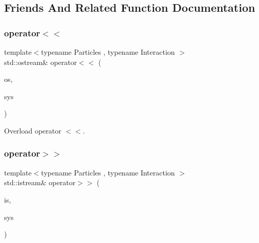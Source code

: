\subsection{Friends And Related Function Documentation}
\mbox{\label{class_space_h_1_1_particle_system_adfa6e43fea537f62484260b659155912}} 
\subsubsection{\texorpdfstring{operator$<$$<$}{operator<<}}
{\footnotesize\ttfamily template$<$typename Particles , typename Interaction $>$ \\
std\+::ostream\& operator$<$$<$ (\begin{DoxyParamCaption}\item[{std\+::ostream \&}]{os,  }\item[{const \mbox{\hyperlink{class_space_h_1_1_particle_system}{Particle\+System}}$<$ \mbox{\hyperlink{struct_space_h_1_1_particles}{Particles}}, Interaction $>$ \&}]{sys }\end{DoxyParamCaption})\hspace{0.3cm}{\ttfamily [friend]}}



Overload operator $<$$<$. 

\mbox{\label{class_space_h_1_1_particle_system_a5e0b0ba1120f72d983344016f57daa92}} 
\subsubsection{\texorpdfstring{operator$>$$>$}{operator>>}}
{\footnotesize\ttfamily template$<$typename Particles , typename Interaction $>$ \\
std\+::istream\& operator$>$$>$ (\begin{DoxyParamCaption}\item[{std\+::istream \&}]{is,  }\item[{\mbox{\hyperlink{class_space_h_1_1_particle_system}{Particle\+System}}$<$ \mbox{\hyperlink{struct_space_h_1_1_particles}{Particles}}, Interaction $>$ \&}]{sys }\end{DoxyParamCaption})\hspace{0.3cm}{\ttfamily [friend]}}




